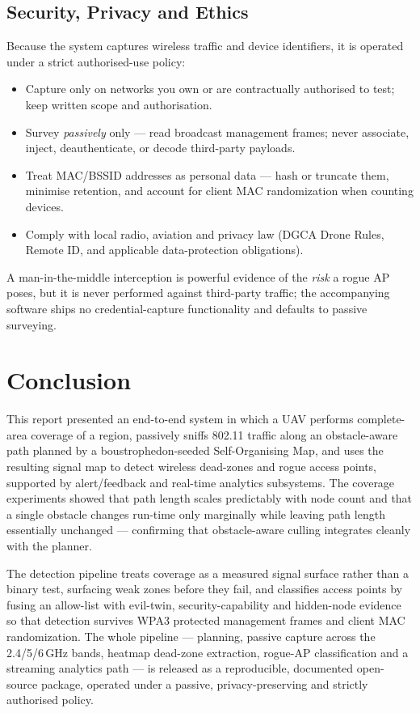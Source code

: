 \section{Security, Privacy and Ethics}
\label{sec:ethics}
Because the system captures wireless traffic and device identifiers, it is
operated under a strict authorised-use policy:
\begin{itemize}
  \item Capture only on networks you own or are contractually authorised to test;
        keep written scope and authorisation.
  \item Survey \emph{passively} only --- read broadcast management frames; never
        associate, inject, deauthenticate, or decode third-party payloads.
  \item Treat MAC/BSSID addresses as personal data --- hash or truncate them,
        minimise retention, and account for client MAC randomization when counting
        devices.
  \item Comply with local radio, aviation and privacy law (DGCA Drone Rules,
        Remote ID, and applicable data-protection obligations).
\end{itemize}
A man-in-the-middle interception is powerful evidence of the \emph{risk} a rogue
AP poses, but it is never performed against third-party traffic; the accompanying
software ships no credential-capture functionality and defaults to passive
surveying.

\chapter{Conclusion}
This report presented an end-to-end system in which a UAV performs complete-area
coverage of a region, passively sniffs 802.11 traffic along an obstacle-aware path
planned by a boustrophedon-seeded Self-Organising Map, and uses the resulting
signal map to detect wireless dead-zones and rogue access points, supported by
alert/feedback and real-time analytics subsystems. The coverage experiments
showed that path length scales predictably with node count and that a single
obstacle changes run-time only marginally while leaving path length essentially
unchanged --- confirming that obstacle-aware culling integrates cleanly with the
planner.

The detection pipeline treats coverage as a measured signal surface rather than a
binary test, surfacing weak zones before they fail, and classifies access points
by fusing an allow-list with evil-twin, security-capability and hidden-node
evidence so that detection survives WPA3 protected management frames and client
MAC randomization. The whole pipeline --- planning, passive capture across the
2.4/5/6\,GHz bands, heatmap dead-zone extraction, rogue-AP classification and a
streaming analytics path --- is released as a reproducible, documented
open-source package, operated under a passive, privacy-preserving and strictly
authorised policy.


